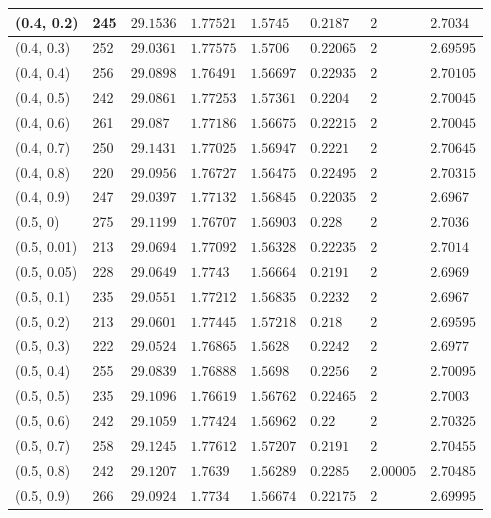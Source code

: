 \begin{center}
{\begin{longtable}{| l | p{} |  p{} | p{} | p{} | p{} | p{} | p{} |}
 (0.4, 0.2) & 245  & $29.1536$ & $1.77521$ & $1.5745$ & $0.2187$ & $2$ & $2.7034$ \\ \hline
 (0.4, 0.3) & 252  & $29.0361$ & $1.77575$ & $1.5706$ & $0.22065$ & $2$ & $2.69595$ \\ \hline
 (0.4, 0.4) & 256  & $29.0898$ & $1.76491$ & $1.56697$ & $0.22935$ & $2$ & $2.70105$ \\ \hline
 (0.4, 0.5) & 242  & $29.0861$ & $1.77253$ & $1.57361$ & $0.2204$ & $2$ & $2.70045$ \\ \hline
 (0.4, 0.6) & 261  & $29.087$ & $1.77186$ & $1.56675$ & $0.22215$ & $2$ & $2.70045$ \\ \hline
 (0.4, 0.7) & 250  & $29.1431$ & $1.77025$ & $1.56947$ & $0.2221$ & $2$ & $2.70645$ \\ \hline
 (0.4, 0.8) & 220  & $29.0956$ & $1.76727$ & $1.56475$ & $0.22495$ & $2$ & $2.70315$ \\ \hline
 (0.4, 0.9) & 247  & $29.0397$ & $1.77132$ & $1.56845$ & $0.22035$ & $2$ & $2.6967$ \\ \hline
 (0.5, 0) & 275  & $29.1199$ & $1.76707$ & $1.56903$ & $0.228$ & $2$ & $2.7036$ \\ \hline
 (0.5, 0.01) & 213  & $29.0694$ & $1.77092$ & $1.56328$ & $0.22235$ & $2$ & $2.7014$ \\ \hline
 (0.5, 0.05) & 228  & $29.0649$ & $1.7743$ & $1.56664$ & $0.2191$ & $2$ & $2.6969$ \\ \hline
 (0.5, 0.1) & 235  & $29.0551$ & $1.77212$ & $1.56835$ & $0.2232$ & $2$ & $2.6967$ \\ \hline
 (0.5, 0.2) & 213  & $29.0601$ & $1.77445$ & $1.57218$ & $0.218$ & $2$ & $2.69595$ \\ \hline
 (0.5, 0.3) & 222  & $29.0524$ & $1.76865$ & $1.5628$ & $0.2242$ & $2$ & $2.6977$ \\ \hline
 (0.5, 0.4) & 255  & $29.0839$ & $1.76888$ & $1.5698$ & $0.2256$ & $2$ & $2.70095$ \\ \hline
 (0.5, 0.5) & 235  & $29.1096$ & $1.76619$ & $1.56762$ & $0.22465$ & $2$ & $2.7003$ \\ \hline
 (0.5, 0.6) & 242  & $29.1059$ & $1.77424$ & $1.56962$ & $0.22$ & $2$ & $2.70325$ \\ \hline
 (0.5, 0.7) & 258  & $29.1245$ & $1.77612$ & $1.57207$ & $0.2191$ & $2$ & $2.70455$ \\ \hline
 (0.5, 0.8) & 242  & $29.1207$ & $1.7639$ & $1.56289$ & $0.2285$ & $2.00005$ & $2.70485$ \\ \hline
 (0.5, 0.9) & 266  & $29.0924$ & $1.7734$ & $1.56674$ & $0.22175$ & $2$ & $2.69995$ \\ \hline

\end{longtable}}
\end{center}
